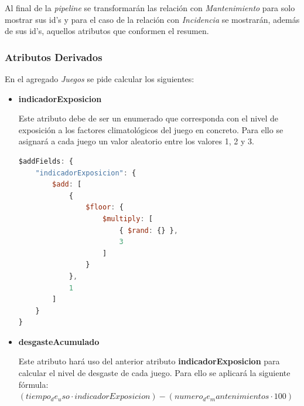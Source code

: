 \documentclass[]{article}
\begin{document}
Al final de la \textit{pipeline} se transformarán las relación con \textit{Mantenimiento} para solo mostrar sus id's y para el caso de la relación con \textit{Incidencia} se mostrarán, además de sus id's, aquellos atributos que conformen el resumen. 

\subsubsection{Atributos Derivados}
\label{subsubsec:derivados_juego}

En el agregado \textit{Juegos} se pide calcular los siguientes:
\begin{itemize}
    \item \textbf{indicadorExposicion}
    
    Este atributo debe de ser un enumerado que corresponda con el nivel de exposición a los factores climatológicos del juego en concreto. Para ello se asignará a cada juego un valor aleatorio entre los valores 1, 2 y 3.
    \begin{lstlisting}[caption=Cálculo de indicadorExposicion, language=JavaScript]
$addFields: {
    "indicadorExposicion": {
        $add: [
            {
                $floor: {
                    $multiply: [
                        { $rand: {} },
                        3
                    ]
                }
            },
            1
        ]
    }
}
    \end{lstlisting}

    \item \textbf{desgasteAcumulado}
    
    Este atributo hará uso del anterior atributo \textbf{indicadorExposicion} para calcular el nivel de desgaste de cada juego. Para ello se aplicará la siguiente fórmula: $( tiempo_de_uso \cdot indicadorExposicion) - (numero_de_mantenimientos \cdot 100)$


\end{itemize}
\end{document}

